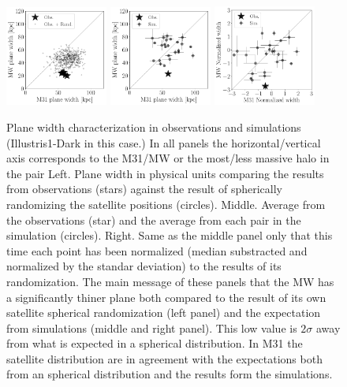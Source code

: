 \documentclass[a4paper,fleqn,usenatbib]{mnras}
\begin{document}

\begin{figure}
\centering
\includegraphics[width=0.30\textwidth]{scatter_random_ranked_width.pdf}
\includegraphics[width=0.30\textwidth]{scatter_ranked_illudm_width.pdf}
\includegraphics[width=0.30\textwidth]{scatter_norm_ranked_illudm_width.pdf}
\caption{Plane width characterization in observations and
  simulations (Illustris1-Dark in this case.) In all panels the
  horizontal/vertical axis corresponds to the  M31/MW or the
  most/less massive halo in the pair 
  Left. Plane width in physical units comparing the results from observations
(stars) against the result of spherically randomizing the satellite
positions (circles). 
Middle. Average from the observations (star) and the average from each
pair in the simulation (circles).
Right. Same as the middle panel only that this time each point has
been normalized (median substracted and normalized by the standar
deviation) to the results of its randomization. 
The main message of these panels that the MW has a significantly
thiner plane both compared to the result of its own satellite
spherical randomization (left panel) and the expectation from
simulations (middle and right panel).  
This low value is $2\sigma$ away from what is expected in a spherical
distribution. 
In M31 the satellite distribution are in agreement with the
expectations both from an spherical distribution and the results form the
simulations. 
\label{fig:scatter_width}}
\end{figure}
\end{document}
